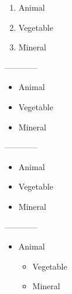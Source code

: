 \documentclass{article}
\begin{document}
\begin{enumerate}
    \item Animal
    \item Vegetable
    \item Mineral
\end{enumerate}
------------
\begin{itemize}
    \item Animal
    \item Vegetable
    \item Mineral
\end{itemize}
------------
\renewcommand{\labelitemi}{*}
\renewcommand{\labelitemii}{\dag}
\begin{itemize}
    \item Animal
    \item Vegetable
    \item Mineral
\end{itemize}
------------
\begin{itemize}
    \item Animal
    \begin{itemize}
        \item Vegetable
        \item Mineral
    \end{itemize}
\end{itemize}
\end{document}

